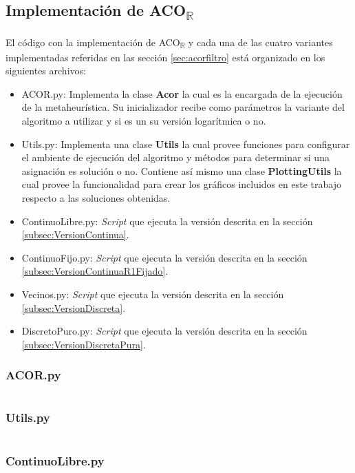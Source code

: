 \documentclass{llncs}
\begin{document}
	\subsection{Implementación de ACO\textsubscript{$\mathbb{R}$}}
	\label{subsec:pythonacor}
	El código con la implementación de ACO\textsubscript{$\mathbb{R}$} y cada una de las cuatro variantes implementadas 
	referidas en las sección \ref{sec:acorfiltro} está organizado en los siguientes archivos:
	\begin{itemize}
		\item ACOR.py: Implementa la clase \textbf{Acor} la cual es la encargada de la ejecución de la metaheurística. 
		Su inicializador recibe como parámetros la variante del algoritmo a utilizar y si es un su versión logarítmica o no.
		\item Utils.py: Implementa una clase \textbf{Utils} la cual provee funciones para configurar el ambiente de ejecución 
		del algoritmo y métodos para determinar si una asignación es solución o no. Contiene así mismo una clase \textbf{PlottingUtils}
		la cual provee la funcionalidad para crear los gráficos incluidos en este trabajo respecto a las soluciones obtenidas.
		\item ContinuoLibre.py: \textit{Script} que ejecuta la versión descrita en la sección \ref{subsec:VersionContinua}.
		\item ContinuoFijo.py:  \textit{Script} que ejecuta la versión descrita en la sección \ref{subsec:VersionContinuaR1Fijado}.
		\item Vecinos.py: \textit{Script} que ejecuta la versión descrita en la sección \ref{subsec:VersionDiscreta}.
		\item DiscretoPuro.py: \textit{Script} que ejecuta la versión descrita en la sección \ref{subsec:VersionDiscretaPura}.
	\end{itemize}

	\subsubsection{ACOR.py}
	\inputminted{python}{ACOR.py}
	\subsubsection{Utils.py}
	\inputminted{python}{Utils.py}
	\subsubsection{ContinuoLibre.py}
	\inputminted{python}{ContinuoLibre.py}
\end{document}
